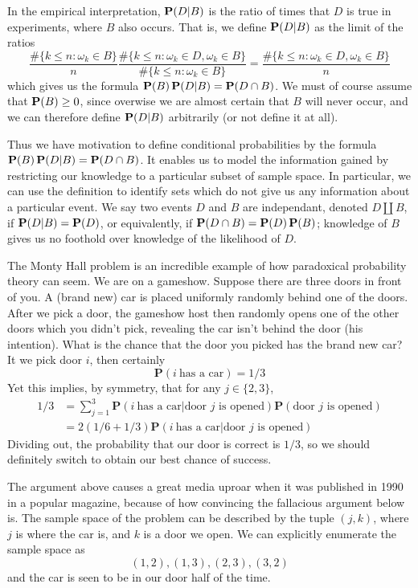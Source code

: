 In the empirical interpretation, $\operatorname{\mathbf{P}}(D | B)$ is the ratio of times that $D$ is true in experiments, where $B$ also occurs. That is, we define $\operatorname{\mathbf{P}}(D | B)$ as the limit of the ratios
%
\[ \frac{\# \{ k \leq n : \omega_k \in B \}}{n} \frac{\# \{ k \leq n : \omega_k \in D, \omega_k \in B \}}{\# \{ k \leq n : \omega_k \in B \}} = \frac{\# \{ k \leq n : \omega_k \in D, \omega_k \in B \}}{n} \]
%
which gives us the formula $\operatorname{\mathbf{P}}(B) \operatorname{\mathbf{P}}(D | B) = \operatorname{\mathbf{P}}(D \cap B)$. We must of course assume that $\operatorname{\mathbf{P}}(B) \geq 0$, since overwise we are almost certain that $B$ will never occur, and we can therefore define $\operatorname{\mathbf{P}}(D | B)$ arbitrarily (or not define it at all).

Thus we have motivation to define conditional probabilities by the formula $\operatorname{\mathbf{P}}(B) \operatorname{\mathbf{P}}(D | B) = \operatorname{\mathbf{P}}(D \cap B)$. It enables us to model the information gained by restricting our knowledge to a particular subset of sample space. In particular, we can use the definition to identify sets which do not give us any information about a particular event. We say two events $D$ and $B$ are independant, denoted $D \amalg B$, if $\operatorname{\mathbf{P}}(D | B) = \operatorname{\mathbf{P}}(D)$, or equivalently, if $\operatorname{\mathbf{P}}(D \cap B) = \operatorname{\mathbf{P}}(D) \operatorname{\mathbf{P}}(B)$; knowledge of $B$ gives us no foothold over knowledge of the likelihood of $D$.

\begin{example}
    The Monty Hall problem is an incredible example of how paradoxical probability theory can seem. We are on a gameshow. Suppose there are three doors in front of you. A (brand new) car is placed uniformly randomly behind one of the doors. After we pick a door, the gameshow host then randomly opens one of the other doors which you didn't pick, revealing the car isn't behind the door (his intention). What is the chance that the door you picked has the brand new car? It we pick door $i$, then certainly
    \[ \mathbf{P}(i\ \text{has a car}) = 1/3 \]
    Yet this implies, by symmetry, that for any $j \in \{ 2, 3 \}$,
    \begin{align*}
        1/3 &= \sum_{j = 1}^3 \mathbf{P}(i\ \text{has a car} | \text{door $j$ is opened}) \mathbf{P}(\text{door $j$ is opened})\\
        &= 2(1/6 + 1/3) \mathbf{P}(i\ \text{has a car} | \text{door $j$ is opened})
    \end{align*}
    Dividing out, the probability that our door is correct is $1/3$, so we should definitely switch to obtain our best chance of success.

    The argument above causes a great media uproar when it was published in 1990 in a popular magazine, because of how convincing the fallacious argument below is. The sample space of the problem can be described by the tuple $(j,k)$, where $j$ is where the car is, and $k$ is a door we open. We can explicitly enumerate the sample space as
    \[ (1,2),(1,3),(2,3),(3,2) \]
    and the car is seen to be in our door half of the time.
\end{example}

